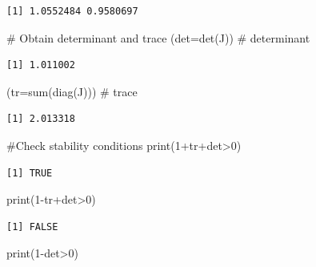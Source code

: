 \documentclass[
  letterpaper,
  DIV=11,
  numbers=noendperiod]{scrreprt}
\newenvironment{Shaded}{\begin{snugshade}}{\end{snugshade}}
\newcommand{\AttributeTok}[1]{\textcolor[rgb]{0.40,0.45,0.13}{#1}}
\newcommand{\CommentTok}[1]{\textcolor[rgb]{0.37,0.37,0.37}{#1}}
\newcommand{\DecValTok}[1]{\textcolor[rgb]{0.68,0.00,0.00}{#1}}
\newcommand{\FunctionTok}[1]{\textcolor[rgb]{0.28,0.35,0.67}{#1}}
\newcommand{\NormalTok}[1]{\textcolor[rgb]{0.00,0.23,0.31}{#1}}
\newcommand{\SpecialCharTok}[1]{\textcolor[rgb]{0.37,0.37,0.37}{#1}}
\begin{document}
\begin{verbatim}
[1] 1.0552484 0.9580697
\end{verbatim}

\begin{Shaded}
\begin{Highlighting}[]
\CommentTok{\# Obtain determinant and trace}
\NormalTok{(}\AttributeTok{det=}\FunctionTok{det}\NormalTok{(J))      }\CommentTok{\# determinant}
\end{Highlighting}
\end{Shaded}

\begin{verbatim}
[1] 1.011002
\end{verbatim}

\begin{Shaded}
\begin{Highlighting}[]
\NormalTok{(}\AttributeTok{tr=}\FunctionTok{sum}\NormalTok{(}\FunctionTok{diag}\NormalTok{(J))) }\CommentTok{\# trace}
\end{Highlighting}
\end{Shaded}

\begin{verbatim}
[1] 2.013318
\end{verbatim}

\begin{Shaded}
\begin{Highlighting}[]
\CommentTok{\#Check stability conditions}
\FunctionTok{print}\NormalTok{(}\DecValTok{1}\SpecialCharTok{+}\NormalTok{tr}\SpecialCharTok{+}\NormalTok{det}\SpecialCharTok{\textgreater{}}\DecValTok{0}\NormalTok{)}
\end{Highlighting}
\end{Shaded}

\begin{verbatim}
[1] TRUE
\end{verbatim}

\begin{Shaded}
\begin{Highlighting}[]
\FunctionTok{print}\NormalTok{(}\DecValTok{1}\SpecialCharTok{{-}}\NormalTok{tr}\SpecialCharTok{+}\NormalTok{det}\SpecialCharTok{\textgreater{}}\DecValTok{0}\NormalTok{)}
\end{Highlighting}
\end{Shaded}

\begin{verbatim}
[1] FALSE
\end{verbatim}

\begin{Shaded}
\begin{Highlighting}[]
\FunctionTok{print}\NormalTok{(}\DecValTok{1}\SpecialCharTok{{-}}\NormalTok{det}\SpecialCharTok{\textgreater{}}\DecValTok{0}\NormalTok{)}
\end{Highlighting}
\end{Shaded}
\end{document}
